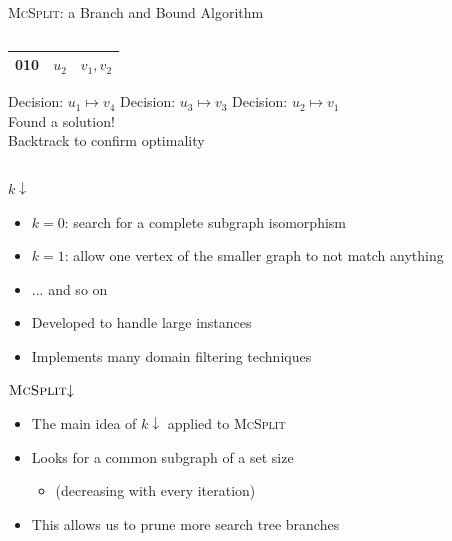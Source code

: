 \documentclass{beamer}
\begin{document}
\begin{frame}{\textsc{McSplit}: a Branch and Bound Algorithm}
\begin{columns}
\begin{column}{0.5\textwidth}
\begin{table}
\begin{overlayarea}{\textwidth}{3cm}
{\begin{tabular}{c c c}
              \midrule
              010 & $u_2$ & $v_1, v_2$ \\
              \bottomrule
            \end{tabular}
          }
        \end{overlayarea}
      \end{table}
      \begin{overprint}
        Decision: $u_1 \mapsto v_4$
        Decision: $u_3 \mapsto v_3$
        Decision: $u_2 \mapsto v_1$\\ Found a solution! \\ Backtrack to confirm optimality
      \end{overprint}
    \end{column}
  \end{columns}
\end{frame}

\begin{frame}{$k{\downarrow}$}
  \begin{itemize}
  \item $k = 0$: search for a complete subgraph isomorphism
  \item $k = 1$: allow one vertex of the smaller graph to not match anything
  \item ... and so on
  \item Developed to handle large instances
  \item Implements many domain filtering techniques
  \end{itemize}
\end{frame}

\begin{frame}{$\textsc{McSplit}{\downarrow}$}
  \begin{itemize}
  \item The main idea of $k{\downarrow}$ applied to \textsc{McSplit}
  \item Looks for a common subgraph of a set size
    \begin{itemize}
    \item (decreasing with every iteration)
    \end{itemize}
  \item This allows us to prune more search tree branches
  \end{itemize}
\end{frame}
\end{document}
